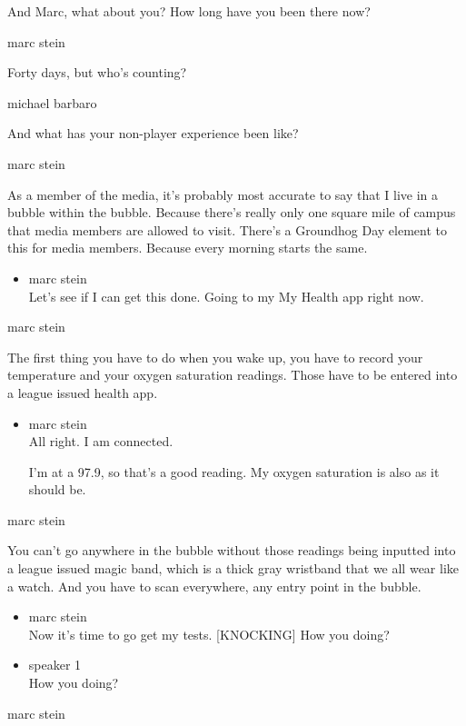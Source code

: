 And Marc, what about you? How long have you been there now?

marc stein

Forty days, but who's counting?

michael barbaro

And what has your non-player experience been like?

marc stein

As a member of the media, it's probably most accurate to say that I live
in a bubble within the bubble. Because there's really only one square
mile of campus that media members are allowed to visit. There's a
Groundhog Day element to this for media members. Because every morning
starts the same.

\begin{itemize}
\tightlist
\item
  marc stein\\
  Let's see if I can get this done. Going to my My Health app right now.
\end{itemize}

marc stein

The first thing you have to do when you wake up, you have to record your
temperature and your oxygen saturation readings. Those have to be
entered into a league issued health app.

\begin{itemize}
\item
  marc stein\\
  All right. I am connected.

  I'm at a 97.9, so that's a good reading. My oxygen saturation is also
  as it should be.
\end{itemize}

marc stein

You can't go anywhere in the bubble without those readings being
inputted into a league issued magic band, which is a thick gray
wristband that we all wear like a watch. And you have to scan
everywhere, any entry point in the bubble.

\begin{itemize}
\item
  marc stein\\
  Now it's time to go get my tests. {[}KNOCKING{]} How you doing?
\item
  speaker 1\\
  How you doing?
\end{itemize}

marc stein

